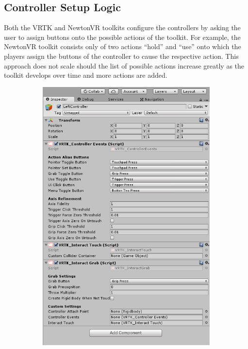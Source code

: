 \documentclass{l4proj}
\begin{document}
\subsection{Controller Setup Logic}
\label{sec:decisioncontrollersetup}
Both the VRTK and NewtonVR toolkits configure the controllers by asking the user to assign buttons onto the possible actions of the toolkit. For example, the NewtonVR toolkit consists only of two actions ``hold'' and ``use'' onto which the players assign the buttons of the controller to cause the respective action. This approach does not scale should the list of possible actions increase greatly as the toolkit develops over time and more actions are added. 

\begin{figure}[h]
\begin{subfigure}[h]{0.3\linewidth}
\includegraphics[width=\linewidth]{dissertation/vrtk_controller_setup.png}

\end{subfigure}
\end{figure}
\end{document}
